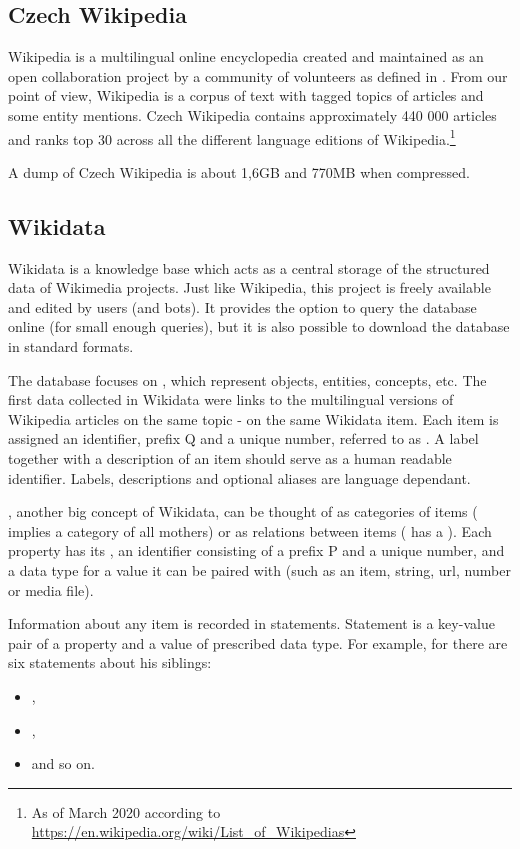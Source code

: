 \subsection{Czech Wikipedia}

Wikipedia is a multilingual online encyclopedia created and maintained as an open collaboration project by a community of volunteers as defined in \cite{wiki:wiki}. From our point of view, Wikipedia is a corpus of text with tagged topics of articles and some entity mentions. Czech Wikipedia contains approximately 440 000 articles and ranks top 30 across all the different language editions of Wikipedia.\footnote{As of March 2020 according to \url{https://en.wikipedia.org/wiki/List\_of\_Wikipedias}}

A dump of Czech Wikipedia is about 1,6GB and 770MB when compressed.

\subsection{Wikidata}

Wikidata is a knowledge base which acts as a central storage of the structured data of Wikimedia projects. Just like Wikipedia, this project is freely available and edited by users (and bots). It provides the option to query the database online (for small enough queries), but it is also possible to download the database in standard formats.

The database focuses on , which represent objects, entities, concepts, etc.  The first data collected in Wikidata were links to the multilingual versions of Wikipedia articles on the same topic - on the same Wikidata item. Each item is assigned an identifier, prefix Q and a unique number, referred to as . A label together with a description of an item should serve as a human readable identifier. Labels, descriptions and optional aliases are language dependant.

, another big concept of Wikidata, can be thought of as categories of items ( implies a category of all mothers) or as relations between items ( has a  ). Each property has its , an identifier consisting of a prefix P and a unique number, and a data type for a value it can be paired with (such as an item, string, url, number or media file). 

Information about any item is recorded in statements. Statement is a key-value pair of a property and a value of prescribed data type. For example, for  there are six statements about his siblings:
\begin{itemize}
\item {} ,
\item {} ,
\item {}  and so on. 
\end{itemize}   

